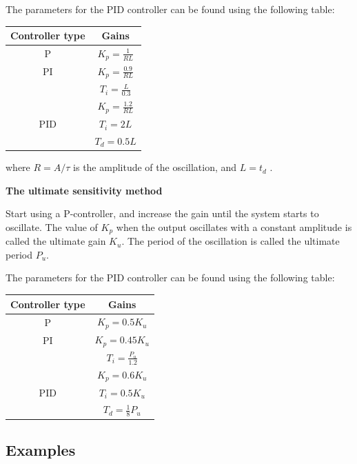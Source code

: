 The parameters for the PID controller can be found using the following table:
\begin{table}[h]
	\centering
	\begin{tabular}{|c|c|}
		\hline
		\cellcolor[HTML]{C0C0C0} \textbf{Controller type} & \cellcolor[HTML]{C0C0C0}\textbf{Gains} \\ \hline
		P                                                 & $K_p=\frac{1}{RL}$                     \\ \hline
		PI                                                & $K_p=\frac{0.9}{RL}$                   \\
		                                                  & $T_i=\frac{L}{0.3}$                    \\ \hline
		                                                  & $K_p=\frac{1.2}{RL}$                   \\
		PID                                               & $T_i=2L$                               \\
		                                                  & $T_d=0.5L$                             \\ \hline
	\end{tabular}
\end{table}

where $R=A/\tau$ is the amplitude of the oscillation, and $L = t_d$ .

\textbf{The ultimate sensitivity method}

Start using a P-controller, and increase the gain until the system starts to oscillate.
The value of $K_p$ when the output oscillates with a constant amplitude is called the ultimate gain $K_u$.
The period of the oscillation is called the ultimate period $P_u$.

The parameters for the PID controller can be found using the following table:
\begin{table}[h]
	\centering
	\begin{tabular}{|c|c|}
		\hline
		\cellcolor[HTML]{C0C0C0} \textbf{Controller type} & \cellcolor[HTML]{C0C0C0}\textbf{Gains} \\ \hline
		P                                                 & $K_p=0.5K_u$                           \\ \hline
		PI                                                & $K_p=0.45K_u$                          \\
		                                                  & $T_i=\frac{P_u}{1.2}$                  \\ \hline
		                                                  & $K_p=0.6K_u$                           \\
		PID                                               & $T_i=0.5K_u$                           \\
		                                                  & $T_d=\frac{1}{8}P_u$                   \\ \hline
	\end{tabular}
\end{table}


\subsection{Examples}
